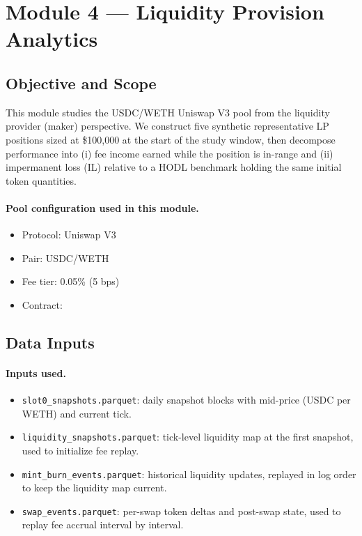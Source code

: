 \section{Module 4 --- Liquidity Provision Analytics}
\label{sec:module4}

\subsection{Objective and Scope}
\label{subsec:m4-objective}
This module studies the USDC/WETH Uniswap V3 pool from the liquidity provider (maker) perspective. We construct five synthetic representative LP positions sized at \$100{,}000 at the start of the study window, then decompose performance into (i) fee income earned while the position is in-range and (ii) impermanent loss (IL) relative to a HODL benchmark holding the same initial token quantities.

\paragraph{Pool configuration used in this module.}
\begin{itemize}
    \item Protocol: Uniswap V3
    \item Pair: USDC/WETH
    \item Fee tier: 0.05\% (5 bps)
    \item Contract: 
\end{itemize}

\subsection{Data Inputs}
\label{subsec:m4-data}
\paragraph{Inputs used.}
\begin{itemize}
    \item \texttt{slot0\_snapshots.parquet}: daily snapshot blocks with mid-price (USDC per WETH) and current tick.
    \item \texttt{liquidity\_snapshots.parquet}: tick-level liquidity map at the first snapshot, used to initialize fee replay.
    \item \texttt{mint\_burn\_events.parquet}: historical liquidity updates, replayed in log order to keep the liquidity map current.
    \item \texttt{swap\_events.parquet}: per-swap token deltas and post-swap state, used to replay fee accrual interval by interval.
\end{itemize}

